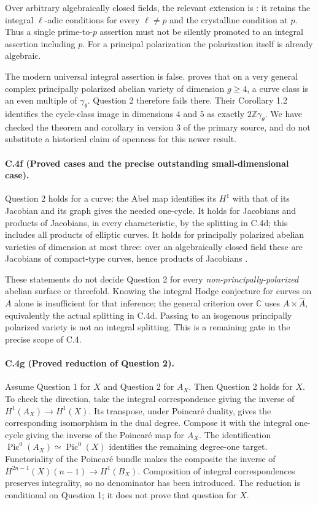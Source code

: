 Over arbitrary algebraically closed fields, the relevant extension is
\citet[Theorem 1.2]{cyScaviaSuzuki2025}: it retains the integral
$\ell$-adic conditions for every $\ell\ne p$ and the crystalline
condition at $p$. Thus a single prime-to-$p$ assertion must not be
silently promoted to an integral assertion including $p$. For a
principal polarization the polarization itself is already algebraic.

The modern universal integral assertion is false.
\citet[Theorem 1.1]{cyEngelFortmanSchreieder2026} proves that on a very
general complex principally polarized abelian variety of dimension
$g\ge4$, a curve class is an even multiple of $\gamma_\theta$.
Question 2 therefore fails there. Their Corollary 1.2 identifies the
cycle-class image in dimensions $4$ and $5$ as exactly
$2\mathbb Z\gamma_\theta$. We have checked the theorem and corollary
in version 3 of the primary source, and do not substitute a historical
claim of openness for this newer result.

\paragraph{C.4f (Proved cases and the precise outstanding small-dimensional case).}
Question 2 holds for a curve: the Abel map identifies its $H^1$ with
that of its Jacobian and its graph gives the needed one-cycle.
It holds for Jacobians and products of Jacobians, in every
characteristic, by the splitting in C.4d; this includes all products
of elliptic curves. It holds for principally polarized abelian
varieties of dimension at most three: over an algebraically closed
field these are Jacobians of compact-type curves, hence products of
Jacobians \citep[Theorem 4]{cyOortUeno1973}.

These statements do not decide Question 2 for every
\emph{non-principally-polarized} abelian surface or threefold.
Knowing the integral Hodge conjecture for curves on $A$ alone is
insufficient for that inference; the general criterion over
$\mathbb C$ uses $A\times\widehat A$, equivalently the actual splitting
in C.4d. Passing to an isogenous principally polarized variety is not
an integral splitting. This is a remaining gate in the precise scope
of C.4.

\paragraph{C.4g (Proved reduction of Question 2).}
Assume Question 1 for $X$ and Question 2 for $A_X$. Then Question 2
holds for $X$. To check the direction, take the integral
correspondence giving the inverse of
$H^1(A_X)\to H^1(X)$. Its transpose, under Poincar\'e duality, gives
the corresponding isomorphism in the dual degree. Compose it with
the integral one-cycle giving the inverse of the Poincar\'e map for
$A_X$. The identification
$\operatorname{Pic}^0(A_X)\simeq\operatorname{Pic}^0(X)$ identifies
the remaining degree-one target. Functoriality of the Poincar\'e
bundle makes the composite the inverse of
$H^{2n-1}(X)(n-1)\to H^1(B_X)$. Composition of integral
correspondences preserves integrality, so no denominator has been
introduced. The reduction is conditional on Question 1; it does not
prove that question for $X$.

